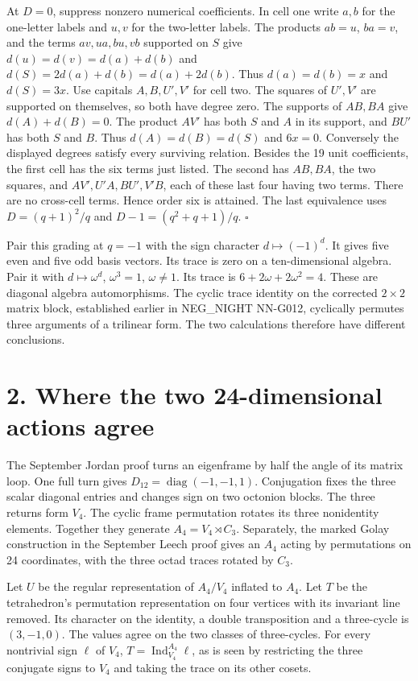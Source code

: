 \documentclass[11pt,a4paper]{article}
\newcommand{\Ind}{\operatorname{Ind}}
\begin{document}
At $D=0$, suppress nonzero numerical coefficients. In cell one write $a,b$ for the one-letter labels and $u,v$ for
the two-letter labels. The products $ab=u$, $ba=v$, and the terms $av,ua,bu,vb$ supported on $S$ give
$d(u)=d(v)=d(a)+d(b)$ and $d(S)=2d(a)+d(b)=d(a)+2d(b)$. Thus $d(a)=d(b)=x$ and $d(S)=3x$.
Use capitals $A,B,U',V'$ for cell two. The squares of $U',V'$ are supported on themselves, so both have degree
zero. The supports of $AB,BA$ give $d(A)+d(B)=0$. The product $AV'$ has both $S$ and $A$ in its support, and
$BU'$ has both $S$ and $B$. Thus $d(A)=d(B)=d(S)$ and $6x=0$.
Conversely the displayed degrees satisfy every surviving relation. Besides the 19 unit coefficients,
the first cell has the six terms just listed. The second has $AB,BA$, the two squares, and $AV',U'A,BU',V'B$,
each of these last four having two terms. There are no cross-cell terms. Hence order six is attained.
The last equivalence uses $D=(q+1)^2/q$ and $D-1=(q^2+q+1)/q$. \hfill$\square$

Pair this grading at $q=-1$ with the sign character $d\mapsto(-1)^d$. It gives five even and five odd basis
vectors. Its trace is zero on a ten-dimensional algebra. Pair it with $d\mapsto\omega^d$, $\omega^3=1$,
$\omega\ne1$. Its trace is $6+2\omega+2\omega^2=4$. These are diagonal algebra automorphisms. The cyclic trace
identity on the corrected $2\times2$ matrix block, established earlier in NEG\_NIGHT NN-G012, cyclically permutes
three arguments of a trilinear form. The two calculations therefore have different conclusions.

\newpage
\section*{2. Where the two 24-dimensional actions agree}
The September Jordan proof turns an eigenframe by half the angle of its matrix loop. One full turn gives
$D_{12}=\operatorname{diag}(-1,-1,1)$. Conjugation fixes the three scalar diagonal entries and changes sign on
two octonion blocks. The three returns form $V_4$. The cyclic frame permutation rotates its three nonidentity
elements. Together they generate $A_4=V_4\rtimes C_3$. Separately, the marked Golay construction in the September
Leech proof gives an $A_4$ acting by permutations on 24 coordinates, with the three octad traces rotated by $C_3$.

Let $U$ be the regular representation of $A_4/V_4$ inflated to $A_4$. Let $T$ be the tetrahedron's permutation
representation on four vertices with its invariant line removed. Its character on the identity, a double
transposition and a three-cycle is $(3,-1,0)$. The values agree on the two classes of three-cycles.
For every nontrivial sign $\ell$ of $V_4$, $T=\Ind_{V_4}^{A_4}\ell$, as is seen by restricting the three conjugate
signs to $V_4$ and taking the trace on its other cosets.
\end{document}
